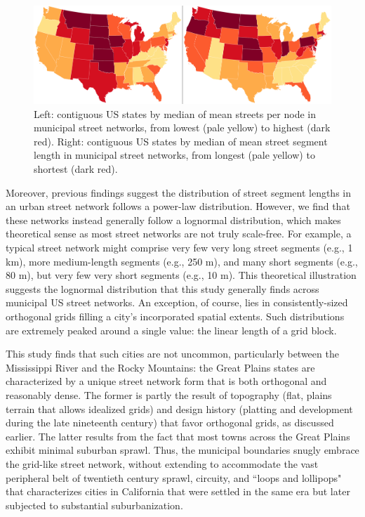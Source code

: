 \documentclass[Afour,sageh,times]{sage/sagej}
\begin{document}
\begin{figure}[h]
	\includegraphics[width=1\textwidth]{media/fig04.png}
	\caption{Left: contiguous US states by median of mean streets per node in municipal street networks, from lowest (pale yellow) to highest (dark red). Right: contiguous US states by median of mean street segment length in municipal street networks, from longest (pale yellow) to shortest (dark red).}
	\label{fig04}
\end{figure}

Moreover, previous findings \citep[e.g.,][]{masucci_random_2009} suggest the distribution of street segment lengths in an urban street network follows a power-law distribution. However, we find that these networks instead generally follow a lognormal distribution, which makes theoretical sense as most street networks are not truly scale-free. For example, a typical street network might comprise very few very long street segments (e.g., 1 km), more medium-length segments (e.g., 250 m), and many short segments (e.g., 80 m), but very few very short segments (e.g., 10 m). This theoretical illustration suggests the lognormal distribution that this study generally finds across municipal US street networks. An exception, of course, lies in consistently-sized orthogonal grids filling a city's incorporated spatial extents. Such distributions are extremely peaked around a single value: the linear length of a grid block.

This study finds that such cities are not uncommon, particularly between the Mississippi River and the Rocky Mountains: the Great Plains states are characterized by a unique street network form that is both orthogonal and reasonably dense. The former is partly the result of topography (flat, plains terrain that allows idealized grids) and design history (platting and development during the late nineteenth century) that favor orthogonal grids, as discussed earlier. The latter results from the fact that most towns across the Great Plains exhibit minimal suburban sprawl. Thus, the municipal boundaries snugly embrace the grid-like street network, without extending to accommodate the vast peripheral belt of twentieth century sprawl, circuity, and ``loops and lollipops" \cite{southworth_streets_1997} that characterizes cities in California that were settled in the same era but later subjected to substantial suburbanization.
\end{document}
